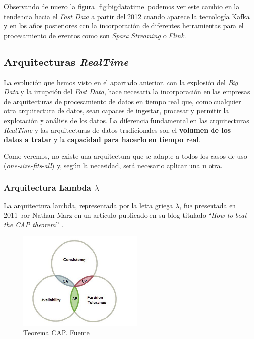 Observando de nuevo la figura \ref{fig:bigdatatime} podemos ver este cambio en la tendencia hacia el \textit{Fast Data} a partir del 2012 cuando aparece la tecnología Kafka y en los años posteriores con la incorporación de diferentes herramientas para el procesamiento de eventos como son \textit{Spark Streaming} o \textit{Flink}.

\subsection{Arquitecturas \textit{RealTime}}
La evolución que hemos visto en el apartado anterior,  con la explosión del \textit{Big Data} y la irrupción del \textit{Fast Data}, hace necesaria la incorporación en las empresas de arquitecturas de procesamiento de datos en tiempo real que, como cualquier otra arquitectura de datos, sean capaces de ingestar, procesar y permitir la explotación y análisis de los datos. La diferencia fundamental en las arquitecturas \textit{RealTime} y las arquitecturas de datos tradicionales son el\textbf{ volumen de los datos a tratar} y la \textbf{capacidad para hacerlo en tiempo real}.

Como veremos, no existe una arquitectura que se adapte a todos los casos de uso (\textit{one-size-fits-all}) y, según la necesidad, será necesario aplicar una u otra.

\subsubsection{Arquitectura Lambda $\lambda$}
La arquitectura lambda, representada por la letra griega $\lambda$, fue presentada en 2011 por Nathan Marz en un artículo publicado en su blog titulado ``\textit{How to beat the CAP theorem}'' \cite{lambda}.

\begin{figure}[!ht]
	\centering
	\includegraphics[width=0.55\textwidth]{images/arte/cap}
	\caption{Teorema CAP. Fuente \cite{cap}}
	\label{fig:cap}
\end{figure}

